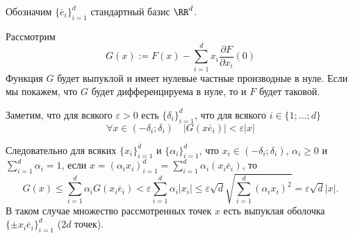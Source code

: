 \documentclass[12pt,a4paper]{article}
\begin{document}
    \begin{enumproblem}
        Обозначим $\{\overline{e}_i\}_{i=1}^d$ стандартный базис $\RR^d$.

        Рассмотрим
        \[G(x) := F(x) - \sum_{i=1}^d x_i \frac{\partial F}{\partial x_i} (0)\]
        Функция $G$ будет выпуклой и имеет нулевые частные производные в нуле. Если мы покажем, что $G$ будет дифференцируема в нуле, то и $F$ будет таковой.

        Заметим, что для всякого $\varepsilon > 0$ есть $\{\delta_i\}_{i=1}^d$, что для всякого $i \in \{1; \dots; d\}$
        \[\forall x \in (-\delta_i; \delta_i) \quad |G(x \overline{e}_i)| < \varepsilon |x|\]

        Следовательно для всяких $\{x_i\}_{i=1}^d$ и $\{\alpha_i\}_{i=1}^d$, что $x_i \in (-\delta_i; \delta_i)$, $\alpha_i \geqslant 0$ и $\sum_{i=1}^d \alpha_i = 1$, если $x = (\alpha_i x_i)_{i=1}^d = \sum_{i=1}^d \alpha_i (x_i \overline{e}_i)$, то
        \[G(x) \leqslant \sum_{i=1}^d \alpha_i G(x_i \overline{e}_i) < \varepsilon \sum_{i=1}^d \alpha_i |x_i| \leqslant \varepsilon \sqrt{d} \sqrt{\sum_{i=1}^d (\alpha_i x_i)^2} = \varepsilon \sqrt{d} |x|.\]
        В таком случае множество рассмотренных точек $x$ есть выпуклая оболочка $\{\pm x_i \overline{e}_i\}_{i=1}^d$ ($2d$ точек).


\end{enumproblem}
\end{document}
